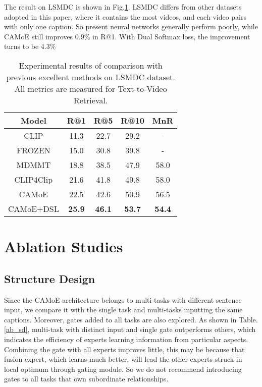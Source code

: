\documentclass[letterpaper]{article} \usepackage{aaai22}  \usepackage{times}  \usepackage{helvet}  \usepackage{courier}  \usepackage[hyphens]{url}  \usepackage{graphicx} \urlstyle{rm} \def\UrlFont{\rm}  \usepackage{natbib}  \usepackage{caption}
\begin{document}
\begin{itemize}
The result on LSMDC is shown in Fig.\ref{lsmdc_result}. LSMDC differs from other datasets adopted in this paper, where it contains the most videos, and each video pairs with only one caption. So present neural networks generally perform poorly, while CAMoE still improves 0.9\% in R@1. With Dual Softmax loss, the improvement turns to be 4.3\%

\begin{table}[h]
\centering
\caption{Experimental results of comparison with previous excellent methods on LSMDC dataset. All metrics are measured for Text-to-Video Retrieval.}
\label{lsmdc_result}
\begin{tabular}{c|c|c|c|c}
\hline
Model &R@1  &R@5 &R@10 &MnR \\
\hline
CLIP &11.3 &22.7 &29.2 &- \\
FROZEN &15.0 &30.8 &39.8 &- \\
MDMMT &18.8 &38.5 &47.9 &58.0 \\
CLIP4Clip &21.6 &41.8 &49.8 &58.0 \\
\hline
CAMoE &22.5 &42.6 &50.9 &56.5 \\
CAMoE+DSL &\textbf{25.9} &\textbf{46.1} &\textbf{53.7} &\textbf{54.4} \\
\hline
\end{tabular}
\end{table}

\end{itemize}



\section{Ablation Studies}

\subsection{Structure Design}
Since the CAMoE architecture belongs to multi-tasks with different sentence input, we compare it with the single task and multi-tasks inputting the same captions. Moreover, gates added to all tasks are also explored. As shown in Table.\ref{ab_sd}, multi-task with distinct input and single gate outperforms others, which indicates the efficiency of experts learning information from particular aspects. Combining the gate with all experts improves little, this may be because that fusion expert, which learns much better, will lead the other experts struck in local optimum through gating module. So we do not recommend introducing gates to all tasks that own subordinate relationships.
\end{document}
